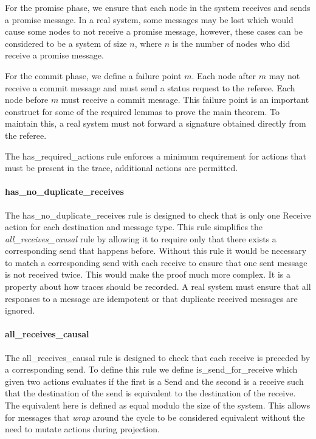 \documentclass[runningheads]{llncs}
\begin{document}
For the promise phase, we ensure that each node in the system receives and sends a promise message. In a real system, some messages may be lost which would cause some nodes to not receive a promise message, however, these cases can be considered to be a system of size $n$, where $n$ is the number of nodes who did receive a promise message. 

For the commit phase, we define a failure point $m$. Each node after $m$ may not receive a commit message and must send a status request to the referee. Each node before $m$ must receive a commit message. This failure point is an important construct for some of the required lemmas to prove the main theorem. To maintain this, a real system must not forward a signature obtained directly from the referee. 

The has\_required\_actions rule enforces a minimum requirement for actions that must be present in the trace, additional actions are permitted.

\paragraph{has\_no\_duplicate\_receives}
The has\_no\_duplicate\_receives rule is designed to check that is only one Receive action for each destination and message type. This rule simplifies the \emph{all\_receives\_causal} rule by allowing it to require only that there exists a corresponding send that happens before. Without this rule it would be necessary to match a corresponding send with each receive to ensure that one sent message is not received twice. This would make the proof much more complex. It is a property about how traces should be recorded. A real system must ensure that all responses to a message are idempotent or that duplicate received messages are ignored. 

\paragraph{all\_receives\_causal}
The all\_receives\_causal rule is designed to check that each receive is preceded by a corresponding send. To define this rule we define is\_send\_for\_receive which given two actions evaluates if the first is a Send and the second is a receive such that the destination of the send is equivalent to the destination of the receive. The equivalent here is defined as equal modulo the size of the system. This allows for messages that \emph{wrap} around the cycle to be considered equivalent without the need to mutate actions during projection. 
\end{document}
